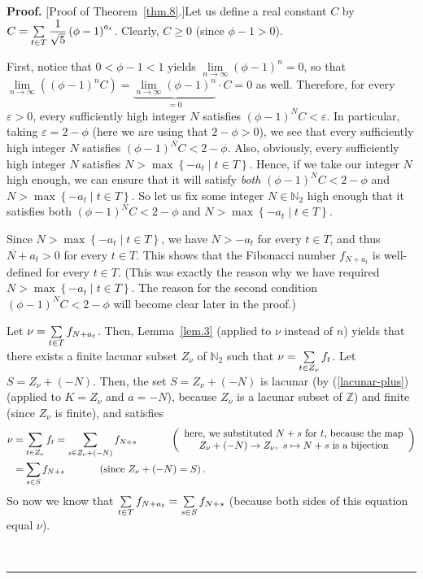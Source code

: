 \documentclass[numbers=enddot,12pt,final,onecolumn,notitlepage]{scrartcl}%
\numberwithin{exer}{section}
\theoremstyle{definition}
\newenvironment{proof}[1][Proof]{\noindent\textbf{#1.} }{\ \rule{0.5em}{0.5em}}
\let\sumnonlimits\sum
\renewcommand{\sum}{\sumnonlimits\limits}
\begin{document}
\begin{proof}
[Proof of Theorem~\ref{thm.8}.]Let us define a real constant $C$ by
$C=\sum\limits_{t\in T}\dfrac{1}{\sqrt{5}}\left(  \phi-1\right)  ^{a_{t}}$.
Clearly, $C\geq0$ (since $\phi-1>0$).

First, notice that $0<\phi-1<1$ yields $\lim\limits_{n\rightarrow\infty
}\left(  \phi-1\right)  ^{n}=0$, so that $\lim\limits_{n\rightarrow\infty
}\left(  \left(  \phi-1\right)  ^{n}C\right)  =\underbrace{\lim
\limits_{n\rightarrow\infty}\left(  \phi-1\right)  ^{n}}_{=0}\cdot C=0$ as
well. Therefore, for every $\varepsilon>0$, every sufficiently high integer
$N$ satisfies $\left(  \phi-1\right)  ^{N}C<\varepsilon$. In particular,
taking $\varepsilon=2-\phi$ (here we are using that $2-\phi>0$), we see that
every sufficiently high integer $N$ satisfies $\left(  \phi-1\right)
^{N}C<2-\phi$. Also, obviously, every sufficiently high integer $N$ satisfies
$N>\max\left\{  -a_{t}\mid t\in T\right\}  $. Hence, if we take our integer
$N$ high enough, we can ensure that it will satisfy \textit{both} $\left(
\phi-1\right)  ^{N}C<2-\phi$ and $N>\max\left\{  -a_{t}\mid t\in T\right\}  $.
So let us fix some integer $N\in\mathbb{N}_{2}$ high enough that it satisfies
both $\left(  \phi-1\right)  ^{N}C<2-\phi$ and $N>\max\left\{  -a_{t}\mid t\in
T\right\}  $.

Since $N>\max\left\{  -a_{t}\mid t\in T\right\}  $, we have $N>-a_{t}$ for
every $t\in T$, and thus $N+a_{t}>0$ for every $t\in T$. This shows that the
Fibonacci number $f_{N+a_{t}}$ is well-defined for every $t\in T$. (This was
exactly the reason why we have required $N>\max\left\{  -a_{t}\mid t\in
T\right\}  $. The reason for the second condition $\left(  \phi-1\right)
^{N}C<2-\phi$ will become clear later in the proof.)

Let $\nu=\sum\limits_{t\in T}f_{N+a_{t}}$. Then, Lemma~\ref{lem.3} (applied to
$\nu$ instead of $n$) yields that there exists a finite lacunar subset
$Z_{\nu}$ of $\mathbb{N}_{2}$ such that $\nu=\sum\limits_{t\in Z_{\nu}}f_{t}$.
Let $S=Z_{\nu}+\left(  -N\right)  $. Then, the set $S=Z_{\nu}+\left(
-N\right)  $ is lacunar (by (\ref{lacunar-plus}) (applied to $K=Z_{\nu}$ and
$a=-N$), because $Z_{\nu}$ is a lacunar subset of $\mathbb{Z}$) and finite
(since $Z_{\nu}$ is finite), and satisfies%
\begin{align*}
\nu &  =\sum\limits_{t\in Z_{\nu}}f_{t}=\sum\limits_{s\in Z_{\nu}+\left(
-N\right)  }f_{N+s}\ \ \ \ \ \ \ \ \ \ \left(
\begin{array}
[c]{c}%
\text{here, we substituted }N+s\text{ for }t\text{, because the map}\\
Z_{\nu}+\left(  -N\right)  \rightarrow Z_{\nu},\text{ }s\mapsto N+s\text{ is a
bijection}%
\end{array}
\right) \\
&  =\sum\limits_{s\in S}f_{N+s}\ \ \ \ \ \ \ \ \ \ \left(  \text{since }%
Z_{\nu}+\left(  -N\right)  =S\right)  .
\end{align*}
So now we know that $\sum\limits_{t\in T}f_{N+a_{t}}=\sum\limits_{s\in
S}f_{N+s}$ (because both sides of this equation equal $\nu$).


\end{proof}
\end{document}
